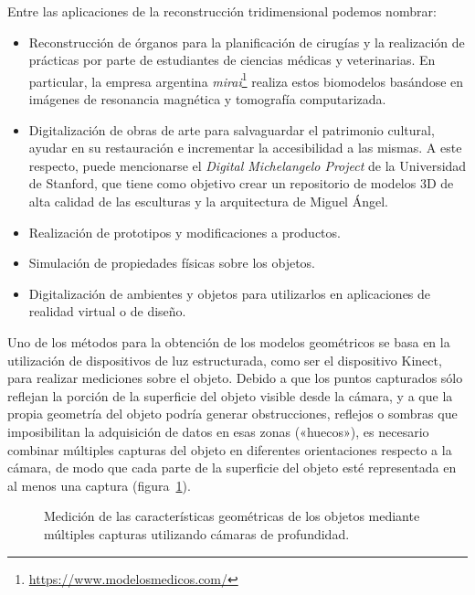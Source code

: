 	Entre las aplicaciones de la reconstrucción tridimensional podemos nombrar:
	\begin{itemize}
		\item Reconstrucción de órganos para la planificación de cirugías
			y la realización de prácticas por parte de estudiantes de ciencias médicas y veterinarias.
			En particular, la empresa argentina \emph{mirai}\footnote{\url{https://www.modelosmedicos.com/}} realiza estos biomodelos basándose en imágenes de resonancia magnética y tomografía computarizada.
		\item Digitalización de obras de arte para salvaguardar el patrimonio cultural,
			ayudar en su restauración e incrementar la accesibilidad a las mismas.
			A este respecto, puede mencionarse el \emph{Digital Michelangelo Project} de la Universidad de Stanford, que tiene como objetivo crear un repositorio de modelos 3D de alta calidad de las esculturas y la arquitectura de Miguel Ángel.
		\item Realización de prototipos y modificaciones a productos.
		\item Simulación de propiedades físicas sobre los objetos.
		\item Digitalización de ambientes y objetos para utilizarlos en aplicaciones de realidad virtual o de diseño.
	\end{itemize}

	Uno de los métodos para la obtención de los modelos geométricos
	se basa en la utilización de dispositivos de luz estructurada,
	como ser el dispositivo Kinect\cite{MatheEstudioKinect},
	para realizar mediciones sobre el objeto.
	Debido a que los puntos capturados sólo reflejan la porción de la superficie del objeto visible desde la cámara,
	y a que la propia geometría del objeto podría generar obstrucciones, reflejos o sombras
	que imposibilitan la adquisición de datos en esas zonas («huecos»),
	es necesario combinar múltiples capturas
	del objeto en diferentes orientaciones respecto a la cámara, de modo que
	cada parte de la superficie del objeto esté representada en al menos una captura (figura~\ref{fig:kinect_reconstruction}).

	\begin{figure}
		\caption{\label{fig:kinect_reconstruction}Medición de las características geométricas de los objetos mediante múltiples capturas utilizando cámaras de profundidad.}
	\end{figure}

